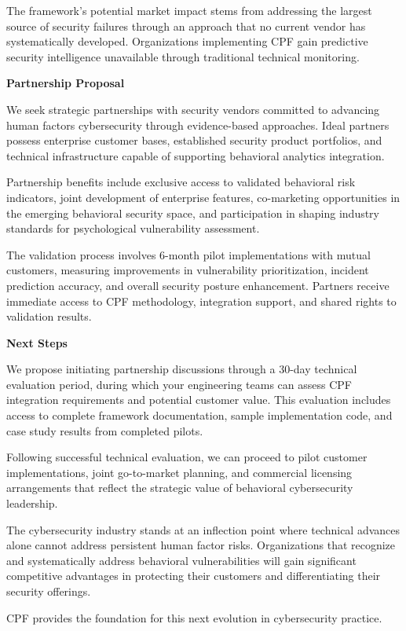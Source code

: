 \documentclass[11pt,a4paper]{article}
\begin{document}
The framework's potential market impact stems from addressing the largest source of security failures through an approach that no current vendor has systematically developed. Organizations implementing CPF gain predictive security intelligence unavailable through traditional technical monitoring.

\textbf{Partnership Proposal}

We seek strategic partnerships with security vendors committed to advancing human factors cybersecurity through evidence-based approaches. Ideal partners possess enterprise customer bases, established security product portfolios, and technical infrastructure capable of supporting behavioral analytics integration.

Partnership benefits include exclusive access to validated behavioral risk indicators, joint development of enterprise features, co-marketing opportunities in the emerging behavioral security space, and participation in shaping industry standards for psychological vulnerability assessment.

The validation process involves 6-month pilot implementations with mutual customers, measuring improvements in vulnerability prioritization, incident prediction accuracy, and overall security posture enhancement. Partners receive immediate access to CPF methodology, integration support, and shared rights to validation results.

\textbf{Next Steps}

We propose initiating partnership discussions through a 30-day technical evaluation period, during which your engineering teams can assess CPF integration requirements and potential customer value. This evaluation includes access to complete framework documentation, sample implementation code, and case study results from completed pilots.

Following successful technical evaluation, we can proceed to pilot customer implementations, joint go-to-market planning, and commercial licensing arrangements that reflect the strategic value of behavioral cybersecurity leadership.

The cybersecurity industry stands at an inflection point where technical advances alone cannot address persistent human factor risks. Organizations that recognize and systematically address behavioral vulnerabilities will gain significant competitive advantages in protecting their customers and differentiating their security offerings.

CPF provides the foundation for this next evolution in cybersecurity practice.
\end{document}
